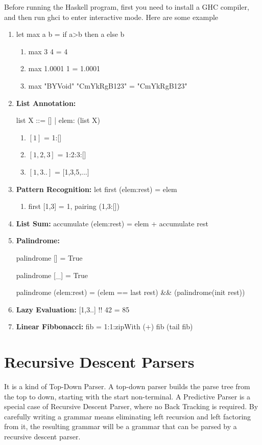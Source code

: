 \documentclass[a4paper]{article}
\theoremstyle{definition}
\begin{document}
Before running the Haskell program, first you need to install a GHC compiler, and then run ghci to enter interactive mode. Here are some example
\begin{enumerate}
    \item let max a b = if a>b then a else b
    \begin{enumerate}
        \item max 3 4 = 4
        \item max 1.0001 1 = 1.0001
        \item max "BYVoid" "CmYkRgB123" = "CmYkRgB123"
    \end{enumerate}
    \item \textbf{List Annotation:}
    
    list X ::= [] | elem: (list  X)
    \begin{enumerate}
        \item $\left[ 1 \right]$ = 1:[]
        \item $\left[ 1,2,3 \right]$ = 1:2:3:[]
        \item $\left[ 1,3 .. \right]$ = [1,3,5,...]
    \end{enumerate}
    \item \textbf{Pattern Recognition:} let first (elem:rest) = elem
    \begin{enumerate}
        \item first [1,3] = 1, pairing (1,3:[])
    \end{enumerate}
    \item \textbf{List Sum:} accumulate (elem:rest) = elem + accumulate rest
    \item \textbf{Palindrome:} 
    
    palindrome []  = True
    
     palindrome [\_] = True
     
     palindrome (elem:rest) = (elem == last rest) \&\& (palindrome(init rest))
     \item \textbf{Lazy Evaluation:} [1,3..] !! 42 = 85
     \item \textbf{Linear Fibbonacci:} fib = 1:1:zipWith (+) fib (tail fib)
\end{enumerate}

\section{Recursive Descent Parsers}
It is a kind of Top-Down Parser. A top-down parser builds the parse tree from the top to down, starting with the start non-terminal. A Predictive Parser is a special case of Recursive Descent Parser, where no Back Tracking is required.
By carefully writing a grammar means eliminating left recursion and left factoring from it, the resulting grammar will be a grammar that can be parsed by a recursive descent parser.
\end{document}

